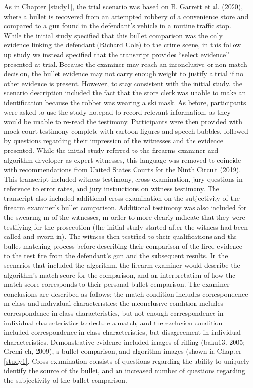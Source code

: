 \documentclass[print]{nuthesis}
\begin{document}
As in Chapter \ref{study1}, the trial scenario was based on B. Garrett et al. (2020), where a bullet is recovered from an attempted robbery of a convenience store and compared to a gun found in the defendant's vehicle in a routine traffic stop.
While the initial study specified that this bullet comparison was the only evidence linking the defendant (Richard Cole) to the crime scene, in this follow up study we instead specified that the transcript provides ``select evidence'' presented at trial.
Because the examiner may reach an inconclusive or non-match decision, the bullet evidence may not carry enough weight to justify a trial if no other evidence is present.
However, to stay consistent with the initial study, the scenario description included the fact that the store clerk was unable to make an identification because the robber was wearing a ski mask.
As before, participants were asked to use the study notepad to record relevant information, as they would be unable to re-read the testimony.
Participants were then provided with mock court testimony complete with cartoon figures and speech bubbles, followed by questions regarding their impression of the witnesses and the evidence presented.
While the initial study referred to the firearms examiner and algorithm developer as expert witnesses, this language was removed to coincide with recommendations from United States Courts for the Ninth Circuit (2019).
This transcript included witness testimony, cross examination, jury questions in reference to error rates, and jury instructions on witness testimony.
The transcript also included additional cross examination on the subjectivity of the firearm examiner's bullet comparison.
Additional testimony was also included for the swearing in of the witnesses, in order to more clearly indicate that they were testifying for the prosecution (the initial study started after the witness had been called and sworn in).
The witness then testified to their qualifications and the bullet matching process before describing their comparison of the fired evidence to the test fire from the defendant's gun and the subsequent results.
In the scenarios that included the algorithm, the firearm examiner would describe the algorithm's match score for the comparison, and an interpretation of how the match score corresponds to their personal bullet comparison.
The examiner conclusions are described as follows: the match condition includes correspondence in class and individual characteristics; the inconclusive condition includes correspondence in class characteristics, but not enough correspondence in individual characteristics to declare a match; and the exclusion condition included correspondence in class characteristics, but disagreement in individual characteristics.
Demonstrative evidence included images of rifling (baku13, 2005; Gremi-ch, 2009), a bullet comparison, and algorithm images (shown in Chapter \ref{study1}.
Cross examination consists of questions regarding the ability to uniquely identify the source of the bullet, and an increased number of questions regarding the subjectivity of the bullet comparison.
\end{document}
